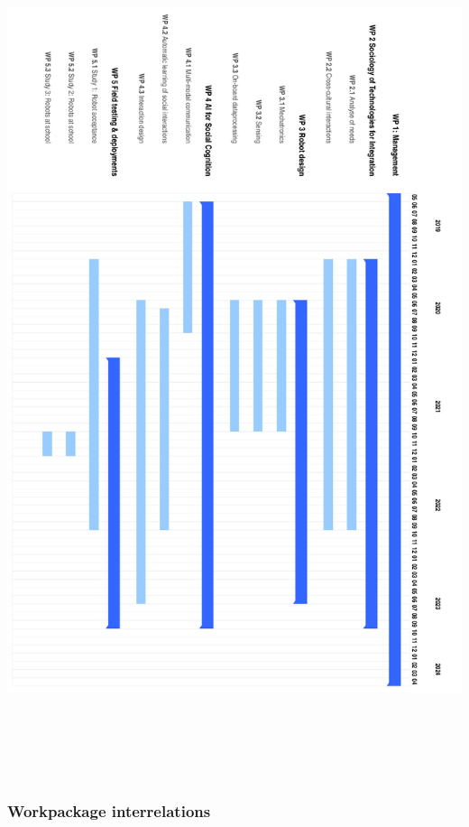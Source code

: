 \documentclass[]{article}
\begin{document}
\includegraphics[width=\textwidth,height=25cm]{gantt.pdf}\\

\hypertarget{workpackage-interrelations}{%
\subsubsection{Workpackage
interrelations}\label{workpackage-interrelations}}
\end{document}
